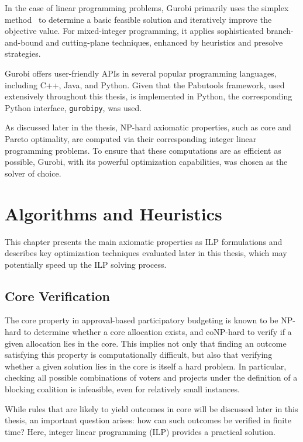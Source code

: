 \documentclass[magisterska,en]{pracamgr}
\begin{document}
In the case of linear programming problems, Gurobi primarily uses the simplex method~\cite{19} to determine a basic feasible solution and iteratively improve the objective value. For mixed-integer programming, it applies sophisticated branch-and-bound and cutting-plane techniques, enhanced by heuristics and presolve strategies.

Gurobi offers user-friendly APIs in several popular programming languages, including C++, Java, and Python. Given that the Pabutools framework, used extensively throughout this thesis, is implemented in Python, the corresponding Python interface, \texttt{gurobipy}, was used.

As discussed later in the thesis, NP-hard axiomatic properties, such as core and Pareto optimality, are computed via their corresponding integer linear programming problems. To ensure that these computations are as efficient as possible, Gurobi, with its powerful optimization capabilities, was chosen as the solver of choice.

\chapter{Algorithms and Heuristics}
\label{algorithms-and-heuristics}

This chapter presents the main axiomatic properties as ILP formulations and describes key optimization techniques evaluated later in this thesis, which may potentially speed up the ILP solving process.

\section{Core Verification}

The core property in approval-based participatory budgeting is known to be NP-hard to determine whether a core allocation exists, and coNP-hard to verify if a given allocation lies in the core. This implies not only that finding an outcome satisfying this property is computationally difficult, but also that verifying whether a given solution lies in the core is itself a hard problem. In particular, checking all possible combinations of voters and projects under the definition of a blocking coalition is infeasible, even for relatively small instances.

While rules that are likely to yield outcomes in core will be discussed later in this thesis, an important question arises: how can such outcomes be verified in finite time? Here, integer linear programming (ILP) provides a practical solution.
\end{document}
